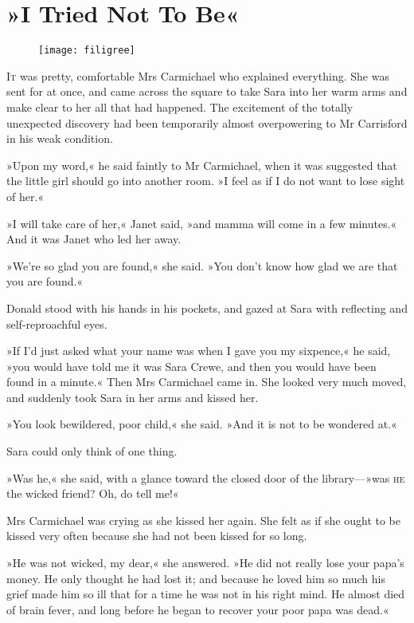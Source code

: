 \chapter{»I Tried Not To Be«}

\begin{figure}[t!]
\centering
\texttt{[image: filigree]}
\end{figure}

\lettrine[lines=5]{I}{t} was pretty, comfortable Mrs Carmichael who explained everything. She was sent for at once, and came across the square to take Sara into her warm arms and make clear to her all that had happened. The excitement of the totally unexpected discovery had been temporarily almost overpowering to Mr Carrisford in his weak condition.

»Upon my word,« he said faintly to Mr Carmichael, when it was suggested that the little girl should go into another room. »I feel as if I do not want to lose sight of her.«

»I will take care of her,« Janet said, »and mamma will come in a few minutes.« And it was Janet who led her away.

»We're so glad you are found,« she said. »You don't know how glad we are that you are found.«

Donald stood with his hands in his pockets, and gazed at Sara with reflecting and self-reproachful eyes.

»If I'd just asked what your name was when I gave you my sixpence,« he said, »you would have told me it was Sara Crewe, and then you would have been found in a minute.« Then Mrs Carmichael came in. She looked very much moved, and suddenly took Sara in her arms and kissed her.

»You look bewildered, poor child,« she said. »And it is not to be wondered at.«

Sara could only think of one thing.

»Was he,« she said, with a glance toward the closed door of the library—»was \textsc{he} the wicked friend? Oh, do tell me!«

Mrs Carmichael was crying as she kissed her again. She felt as if she ought to be kissed very often because she had not been kissed for so long.

»He was not wicked, my dear,« she answered. »He did not really lose your papa's money. He only thought he had lost it; and because he loved him so much his grief made him so ill that for a time he was not in his right mind. He almost died of brain fever, and long before he began to recover your poor papa was dead.«

